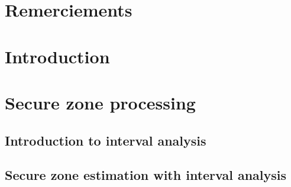 \documentclass[12pt,fleqn]{report} %
\begin{document}
\renewcommand{\contentsname}{Sommaire}                %
\renewcommand{\bibname}{Références bibliographiques}  %
\renewcommand{\glossaryname}{Glossaire}               %




\tableofcontents  %
\cleardoublepage  %
\chapter*{Remerciements}

\chapter{Introduction}


\chapter{Secure zone processing}

\section{Introduction to interval analysis}

\section{Secure zone estimation with interval analysis}

\end{document}
